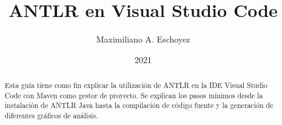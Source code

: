 \documentclass[a5paper,10pt]{article}
\author{Maximiliano A. Eschoyez}
\title{ANTLR en Visual Studio Code}
\date{2021}
\begin{document}
\maketitle


\begin{abstract}
	Esta guía tiene como fin explicar la utilización de ANTLR en la IDE Visual Studio Code con Maven como gestor de proyecto.  Se explican los pasos mínimos desde la instalación de ANTLR Java hasta la compilación de código fuente y la generación de diferentes gráficos de análisis.
\end{abstract}



\clearpage




\end{document}
